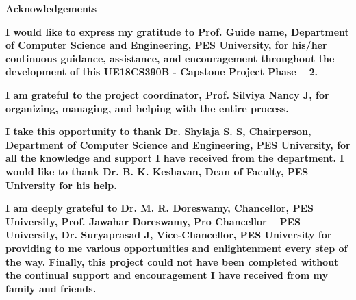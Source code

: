 
\begin{titlepage}

\centerline{\huge{\textbf{Acknowledgements}}}

\vspace{1cm}
\large

\par \textbf{I would like to express my gratitude to Prof. Guide name, Department of Computer Science and Engineering, PES University, for his/her continuous guidance, assistance, and encouragement throughout the development of this UE18CS390B - Capstone Project Phase – 2.}
\par \textbf{I am grateful to the project coordinator, Prof. Silviya Nancy J, for organizing, managing, and helping with the entire process.}
\par \textbf{I take this opportunity to thank Dr. Shylaja S. S, Chairperson, Department of Computer Science and Engineering, PES University, for all the knowledge and support I have received from the department. I would like to thank Dr. B. K. Keshavan, Dean of Faculty, PES University for his help.}
\par \textbf{I am deeply grateful to Dr. M. R. Doreswamy, Chancellor, PES University, Prof. Jawahar Doreswamy, Pro Chancellor – PES University, Dr. Suryaprasad J, Vice-Chancellor, PES University for providing to me various opportunities and enlightenment every step of the way. Finally, this project could not have been completed without the continual support and encouragement I have received from my family and friends.}



\end{titlepage}